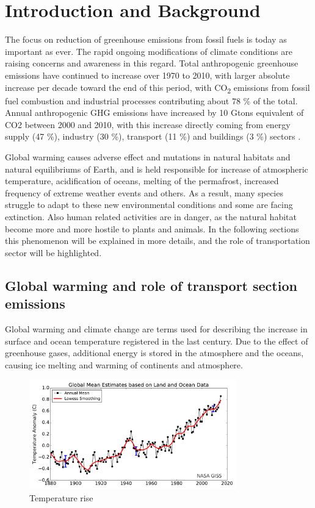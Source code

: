 \documentclass[12pt]{report}   %
\begin{document}
\chapter{Introduction and Background}

The focus on reduction of greenhouse emissions from fossil fuels is today as important as ever. The rapid ongoing modifications of climate conditions are raising concerns and awareness in this regard. Total anthropogenic greenhouse emissions have continued to increase over 1970 to 2010, with larger absolute  increase per decade toward the end of this period, with CO\textsubscript{2} emissions from fossil fuel combustion and industrial processes contributing about 78 \% of the total. Annual anthropogenic GHG emissions have increased by 10 Gtons equivalent of CO2 between 2000 and 2010, with this increase directly coming from energy supply (47 \%), industry (30 \%), transport (11 \%) and buildings (3 \%) sectors \cite{IPCC2014}.

Global warming causes adverse effect and mutations in natural habitats and natural equilibriums of Earth, and is held responsible for increase of atmospheric temperature, acidification of oceans, melting of the permafrost, increased frequency of extreme weather events and others. As a result, many species struggle to adapt to these new environmental conditions and some are facing extinction. Also human related activities are in danger, as the natural habitat become more and more hostile to plants and animals. In the following sections this phenomenon will be explained in more details, and  the role of transportation sector will be highlighted.

\section{Global warming and role of transport section emissions} \label{sec:global_warming}

Global warming and climate change are terms used for describing the increase in surface and ocean temperature registered in the last century. Due to the effect of greenhouse gases, additional energy is stored in the atmosphere and the oceans, causing ice melting and warming of continents and atmosphere. 

\begin{figure}[h]
  \centering
  \includegraphics[width=0.8\textwidth]{figures/introduction/temp_rise.pdf}
  \caption{Temperature rise \cite{GISS2016}}
  \label{antropogenic_ghg_emissions}
\end{figure}
\end{document}
